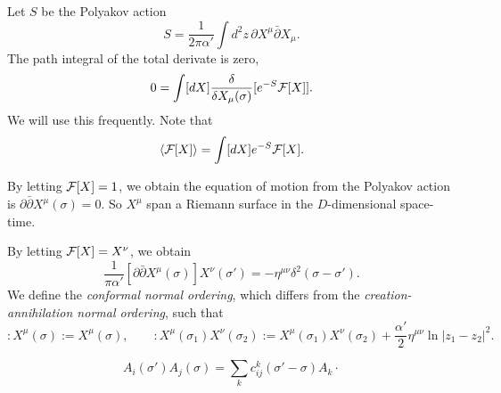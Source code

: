 \documentclass{../../large}
\begin{document}
\begin{prb}
Let $S$ be the Polyakov action
\[S=\frac1{2\pi\alpha'}\int d^2z\,\partial X^\mu\bar\partial X_\mu.\]
The path integral of the total derivate is zero,
\[0=\int[dX]\frac\delta{\delta X_\mu(\sigma)}[e^{-S}\mathcal{F}[X]].\]
We will use this frequently.
Note that
\[\langle\mathcal{F}[X]\rangle=\int[dX]e^{-S}\mathcal{F}[X].\]
\begin{parts}
\item By letting $\mathcal{F}[X]=1$, we obtain the equation of motion from the Polyakov action is $\partial\bar\partial X^\mu(\sigma)=0$.
So $X^\mu$ span a Riemann surface in the $D$-dimensional space-time.
\item By letting $\mathcal{F}[X]=X^\nu$, we obtain
\[\frac1{\pi\alpha'}[\partial\bar\partial X^\mu(\sigma)]X^\nu(\sigma')=-\eta^{\mu\nu}\delta^2(\sigma-\sigma').\]
We define the \emph{conformal normal ordering}, which differs from the \emph{creation-annihilation normal ordering}, such that
\[:X^\mu(\sigma):=X^\mu(\sigma),\qquad:X^\mu(\sigma_1)X^\nu(\sigma_2):=X^\mu(\sigma_1)X^\nu(\sigma_2)+\frac{\alpha'}2\eta^{\mu\nu}\ln|z_1-z_2|^2.\]
\end{parts}	
\end{prb}


\begin{prb}
\[A_i(\sigma')A_j(\sigma)=\sum_k c^k_{ij}(\sigma'-\sigma)A_k\cdot\]
\end{prb}
\end{document}
